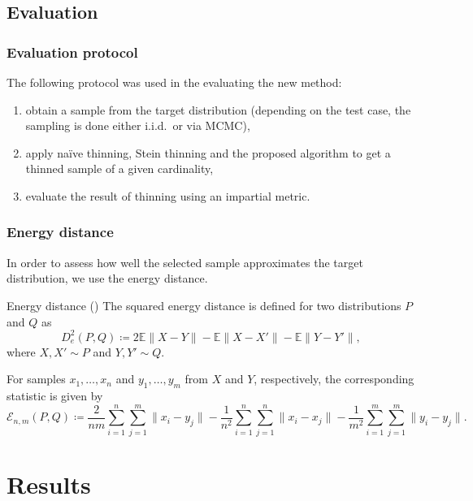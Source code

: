 \documentclass{beamer}
\begin{document}
\subsection{Evaluation}

\begin{frame}
\frametitle{Evaluation protocol}

The following protocol was used in the evaluating the new method:
\begin{enumerate}
\item obtain a sample from the target distribution (depending on the test case, the sampling is done either i.i.d.\ or via MCMC),
\item apply na\"ive thinning, Stein thinning and the proposed algorithm to get a thinned sample of a given cardinality,
\item evaluate the result of thinning using an impartial metric.
\end{enumerate}

\end{frame}

\begin{frame}
\frametitle{Energy distance}

In order to assess how well the selected sample approximates the target distribution, we use the energy distance.

\begin{block}{Energy distance (\cite{rizzoEnergyDistance2016})}
The squared energy distance is defined for two distributions $P$ and $Q$ as
\begin{equation*}
D^2_e(P, Q) \coloneq 2 \mathbb{E} \|X - Y\| - \mathbb{E}\|X - X'\| - \mathbb{E} \|Y - Y'\|,
\end{equation*}
where $X, X' \sim P$ and $Y, Y' \sim Q$.
\end{block}

For samples $x_1, \dots, x_n$ and $y_1, \dots, y_m$ from $X$ and $Y$, respectively, the corresponding statistic is given by
\begin{equation*}
\mathcal{E}_{n,m}(P, Q) \coloneq \frac{2}{nm}\sum_{i=1}^n \sum_{j=1}^m \|x_i - y_j\| - \frac{1}{n^2} \sum_{i=1}^n\sum_{j=1}^n \|x_i - x_j\| - \frac{1}{m^2} \sum_{i=1}^m \sum_{j=1}^m \|y_i - y_j\|.
\end{equation*}


\end{frame}

\section{Results}
\end{document}
